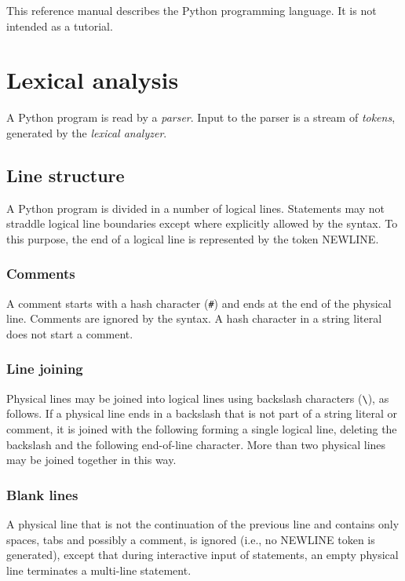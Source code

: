 This reference manual describes the Python programming language.
It is not intended as a tutorial.

\chapter{Lexical analysis}

A Python program is read by a {\em parser}.
Input to the parser is a stream of {\em tokens}, generated
by the {\em lexical analyzer}.

\section{Line structure}

A Python program is divided in a number of logical lines.
Statements may not straddle logical line boundaries except where
explicitly allowed by the syntax.
To this purpose, the end of a logical line
is represented by the token NEWLINE.

\subsection{Comments}

A comment starts with a hash character (\verb/#/) and ends at the end
of the physical line.  Comments are ignored by the syntax.
A hash character in a string literal does not start a comment.

\subsection{Line joining}

Physical lines may be joined into logical lines using backslash
characters (\verb/\/), as follows.
If a physical line ends in a backslash that is not part of a string
literal or comment, it is joined with
the following forming a single logical line, deleting the backslash
and the following end-of-line character.  More than two physical
lines may be joined together in this way.

\subsection{Blank lines}

A physical line that is not the continuation of the previous line
and contains only spaces, tabs and possibly a comment, is ignored
(i.e., no NEWLINE token is generated),
except that during interactive input of statements, an empty
physical line terminates a multi-line statement.

